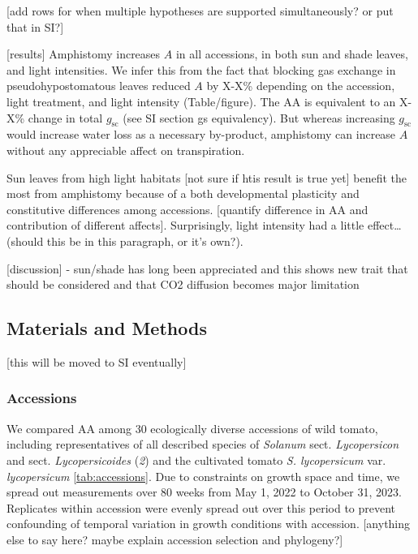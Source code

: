 \documentclass[
  letterpaper,
  DIV=11,
  numbers=noendperiod]{scrartcl}
\begin{document}
{[}add rows for when multiple hypotheses are supported simultaneously?
or put that in SI?{]}

{[}results{]} Amphistomy increases \(A\) in all accessions, in both sun
and shade leaves, and light intensities. We infer this from the fact
that blocking gas exchange in pseudohypostomatous leaves reduced \(A\)
by X-X\% depending on the accession, light treatment, and light
intensity (Table/figure). The AA is equivalent to an X-X\% change in
total \(g_\text{sc}\) (see SI section gs equivalency). But whereas
increasing \(g_\text{sc}\) would increase water loss as a necessary
by-product, amphistomy can increase \(A\) without any appreciable affect
on transpiration.

Sun leaves from high light habitats {[}not sure if htis result is true
yet{]} benefit the most from amphistomy because of a both developmental
plasticity and constitutive differences among accessions. {[}quantify
difference in AA and contribution of different affects{]}. Surprisingly,
light intensity had a little effect\ldots{} (should this be in this
paragraph, or it's own?).

{[}discussion{]} - sun/shade has long been appreciated and this shows
new trait that should be considered and that CO2 diffusion becomes major
limitation

\subsection{Materials and Methods}\label{materials-and-methods}

{[}this will be moved to SI eventually{]}

\subsubsection{Accessions}\label{accessions}

We compared AA among 30 ecologically diverse accessions of wild tomato,
including representatives of all described species of \emph{Solanum}
sect. \emph{Lycopersicon} and sect. \emph{Lycopersicoides} (\emph{2})
and the cultivated tomato \emph{S. lycopersicum} var.
\emph{lycopersicum} \autoref{tab:accessions}. Due to constraints on
growth space and time, we spread out measurements over 80 weeks from May
1, 2022 to October 31, 2023. Replicates within accession were evenly
spread out over this period to prevent confounding of temporal variation
in growth conditions with accession. {[}anything else to say here? maybe
explain accession selection and phylogeny?{]}
\end{document}
